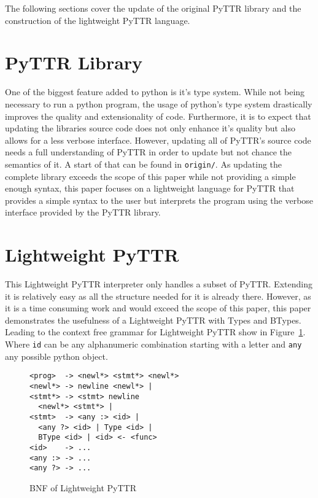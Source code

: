 \documentclass[11pt]{article}
\begin{document}
The following sections cover the update of the original PyTTR library and the construction of the lightweight PyTTR language.

\section{PyTTR Library}

One of the biggest feature added to python is it's type system. While not being necessary to run a python program, the usage of python's type system drastically improves the quality and extensionality of code.
Furthermore, it is to expect that updating the libraries source code does not only enhance it's quality but also allows for a less verbose interface. However, updating all of PyTTR's source code needs a full understanding of PyTTR in order to update but not chance the semantics of it. A start of that can be found in \texttt{origin/}. As updating the complete library exceeds the scope of this paper while not providing a simple enough syntax, this paper focuses on a lightweight language for PyTTR that provides a simple syntax to the user but interprets the program using the verbose interface provided by the PyTTR library.

\section{Lightweight PyTTR}

This Lightweight PyTTR interpreter only handles a subset of PyTTR. Extending it is relatively easy as all the structure needed for it is already there. However, as it is a time consuming work and would exceed the scope of this paper, this paper demonstrates the usefulness of a Lightweight PyTTR with Types and BTypes. Leading to the context free grammar for Lightweight PyTTR show in Figure~\ref{bnf}. Where \texttt{id} can be any alphanumeric combination starting with a letter and \texttt{any} any possible python object.

\begin{figure}
\begin{verbatim}
<prog>  -> <newl*> <stmt*> <newl*>
<newl*> -> newline <newl*> |
<stmt*> -> <stmt> newline
  <newl*> <stmt*> |
<stmt>  -> <any :> <id> |
  <any ?> <id> | Type <id> |
  BType <id> | <id> <- <func>
<id>    -> ...
<any :> -> ...
<any ?> -> ...
\end{verbatim}
\caption{BNF of Lightweight PyTTR}
\label{bnf}
\end{figure}
\end{document}
